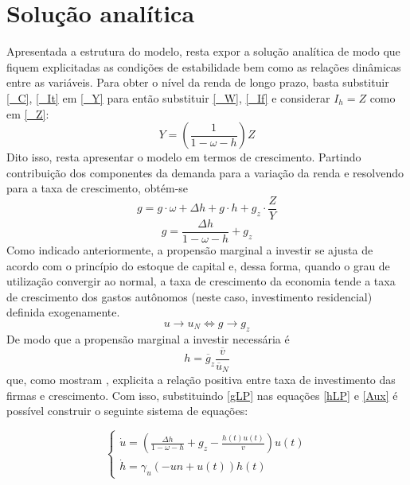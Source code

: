 \section{Solução analítica}
\label{SecAnalitica}

Apresentada a estrutura do modelo, resta expor a solução analítica de modo que fiquem explicitadas as condições de estabilidade bem como as relações dinâmicas entre as variáveis. Para obter o nível da renda de longo prazo, basta substituir \ref{_C}, \ref{_It} em \ref{_Y} para então substituir \ref{_W}, \ref{_If} e considerar $I_h = Z$ como em \ref{_Z}:
\begin{equation}
    \label{AnaliticaNivel}
    Y = \left(\frac{1}{1-\omega - h}\right)Z
\end{equation}
Dito isso, resta apresentar o modelo em termos de crescimento. Partindo contribuição dos componentes da demanda para a variação da renda e resolvendo para a taxa de crescimento, obtém-se
$$
g = g\cdot \omega + \Delta h + g\cdot h + g_z\cdot \frac{Z}{Y}
$$
\begin{equation}
\label{gLP}
    g = \frac{\Delta h}{1 - \omega - h} + g_z
\end{equation}
Como indicado anteriormente, a propensão marginal a investir se ajusta de acordo com o princípio do estoque de capital e, dessa forma, quando o grau de utilização convergir ao normal, a taxa de crescimento da economia tende a taxa de crescimento dos gastos autônomos (neste caso, investimento residencial) definida exogenamente. 
\begin{equation}
u \to u_N \Leftrightarrow g \to g_z
\end{equation}
De modo que a propensão marginal a investir necessária é
\begin{equation}
\label{hLP}
h = \overline g_z\frac{\overline v}{\overline u_N}
\end{equation}
que, como mostram \textcite{fagundes_role_2017}, explicita a relação positiva entre taxa de investimento das firmas e crescimento. Com isso, substituindo \ref{gLP} nas equações \ref{hLP} e \ref{Aux} é possível construir o seguinte sistema de equações:

$$
\begin{cases}
\dot u = \left(\frac{\Delta h}{1 - \omega - h} + g_z - \frac{h{\left(t \right)} u{\left(t \right)}}{v}\right) u{\left(t \right)}\\
\dot h = \gamma_{u} \left(- un + u{\left(t \right)}\right) h{\left(t \right)}
\end{cases}
$$

